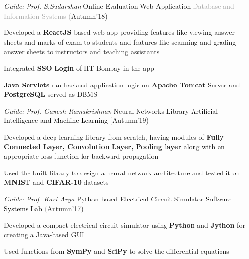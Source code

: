 \begin{cventries}
  \cventry
    {\textit{Guide: Prof. S.Sudarshan}}
    {Online Evaluation Web Application}
    {\textcolor{darkgray} {Database and Information Systems}}
    {\fontsize{9pt}{1em} \textcolor{darkgray}(Autumn'18)}
    {
      \begin{cvitems}
        \item Developed a \textbf{ReactJS} based web app providing features like viewing answer sheets and marks of exam to students and features like scanning and grading answer sheets to instructors and teaching assistants \vspace{0.3mm}
        \item Integrated \textbf{SSO Login} of IIT Bombay in the app \vspace{0.3mm}
        \item \textbf{Java Servlets} ran backend application logic on \textbf{Apache Tomcat} Server and \textbf{PostgreSQL} served as DBMS \vspace{0.3mm}
      \end{cvitems}
    }
  \cventry
    {\textit{Guide: Prof. Ganesh Ramakrishnan}}
    {Neural Networks Library}
    {\textcolor{black} {Artificial Intelligence and Machine Learning}}
    {\fontsize{9pt}{1em} \textcolor{darkgray}(Autumn'19)}
    {
      \begin{cvitems}
        \item Developed a deep-learning library from scratch, having modules of \textbf{Fully Connected Layer, Convolution Layer,
        Pooling layer} along with an appropriate loss function for backward propagation\vspace{0.3mm}
        \item Used the built library to design a neural network architecture and tested it on \textbf{MNIST} and \textbf{CIFAR-10} datasets
      \end{cvitems}
    }
  \cventry
    {\textit{Guide: Prof. Kavi Arya}}
    {Python based Electrical Circuit Simulator}
    {\textcolor{black} {Software Systems Lab}}
    {\fontsize{9pt}{1em} \textcolor{darkgray}(Autumn'17)}
    {
      \begin{cvitems}
        \item Developed a compact electrical circuit simulator using \textbf{Python} and \textbf{Jython} for creating a Java-based GUI \vspace{0.3mm}
        \item Used functions from \textbf{SymPy} and \textbf{SciPy} to solve the differential equations \vspace{0.3mm}

\end{cvitems}}
\end{cventries}
